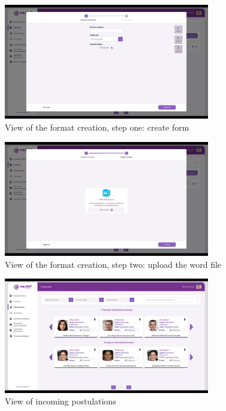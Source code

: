 \documentclass{scrreprt}
\begin{document}
\begin{figure}[H]
	\centering \small
	\includegraphics[width=0.8\textwidth]{WebPrototype/wflow-25.jpeg}
	\caption{View of the format creation, step one: create form}
\end{figure}

\begin{figure}[H]
	\centering \small
	\includegraphics[width=0.8\textwidth]{WebPrototype/wflow-25-2.jpg}
	\caption{View of the format creation, step two: upload the word file}
\end{figure}

\begin{figure}[H]
	\centering \small
	\includegraphics[width=0.8\textwidth]{WebPrototype/wflow-26.jpeg}
	\caption{View of incoming postulations}
\end{figure}
\end{document}
